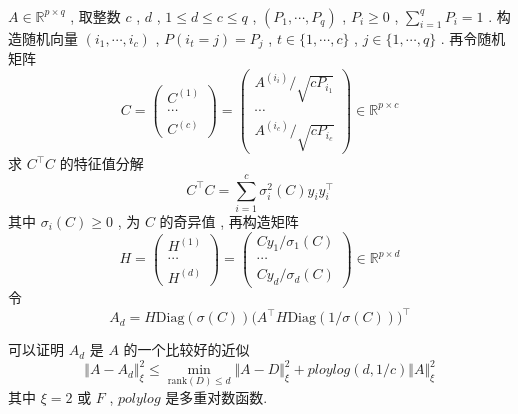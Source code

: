 \documentclass[a4paper, UTF8]{ctexart}				%
\numberwithin{equation}{section}				%
\newcommand{\upcite}[1]{\textsuperscript{\textsuperscript{\cite{#1}}}}
\begin{document}
			\paragraph{}
				\quad $A \in \mathbb{R}^{p \times q}$ , 取整数 $c$ , $d$ , $1 \le d \le c \le q$ , $(P_1, \cdots, P_q)$ , $P_i \ge 0$ , $\sum^{q}_{i = 1}P_i = 1$ . 构造随机向量 $(i_1, \cdots, i_c)$ , $P(i_t = j) = P_j$ , $t \in \{1, \cdots, c\}$ , $j \in \{1, \cdots, q\}$ . 再令随机矩阵
				\begin{equation}\label{FPCAC}
						C
					=	\begin{pmatrix}
							C^{(1)} \\ \cdots \\ C^{(c)}
						\end{pmatrix}
					=	\begin{pmatrix}
							A^{(i_i)}/\sqrt{c P_{i_1}} \\ \cdots \\ A^{(i_c)}/\sqrt{c P_{i_c}}
						\end{pmatrix}
					\in	\mathbb{R}^{p \times c}
				\end{equation}
				求 $C ^\top C$ 的特征值分解
				\begin{equation}\label{FPCASgm}
						C ^\top C 
					=	\sum^{c}_{i = 1}\sigma_i^2(C) y_i y_i^\top
				\end{equation}
				其中 $\sigma_i(C) \ge 0$ , 为 $C$ 的奇异值 , 再构造矩阵
				\begin{equation}\label{FPCAH}
						H 
					=	\begin{pmatrix}
							H^{(1)} \\ \cdots \\ H^{(d)}
						\end{pmatrix}
					=	\begin{pmatrix}
							Cy_1/\sigma_1(C) \\ \cdots \\ Cy_d/\sigma_d(C)
						\end{pmatrix}
					\in	\mathbb{R}^{p \times d}
				\end{equation}
				令
				\begin{equation}\label{FPCAAk}
						A_d
					=	H \text{Diag}(\sigma(C)) \big(A ^\top H \text{Diag}(1/\sigma(C))\big)^\top
				\end{equation}

				可以证明 $A_d$ 是 $A$ 的一个比较好的近似 \upcite{drineas2006fast}
				\begin{equation}
						\Vert{A - A_d}\Vert^2_\xi 
					\le	\min_{\text{rank}(D) \le d} \Vert{A - D}\Vert^2_\xi + ploylog(d, 1/c) \Vert{A}\Vert^2_\xi
				\end{equation}
				其中 $\xi = 2 \text{ 或 } F$ , $polylog$ 是多重对数函数. 
				
\end{document}
